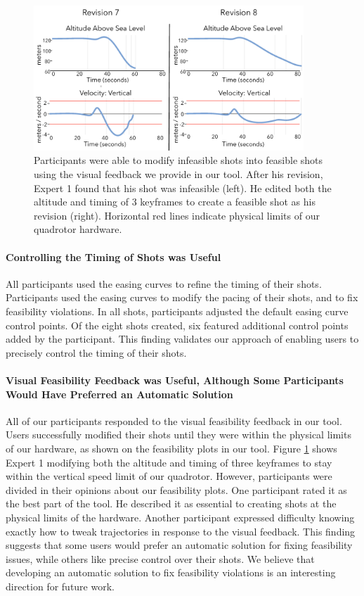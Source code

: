 \begin{figure}[t]
\centering
\includegraphics[width=4.0in]{images/2015_siggraph_asia/edit-infeasible.pdf}
\caption{
Participants were able to modify infeasible shots into feasible shots using the visual feedback we provide in our tool.
After his  revision, Expert 1 found that his shot was infeasible (left).
He edited both the altitude and timing of 3 keyframes to create a feasible shot as his  revision (right).
Horizontal red lines indicate physical limits of our quadrotor hardware.
}
\label{fig:ch2:feasibility_fix}
\end{figure}

\paragraph{Controlling the Timing of Shots was Useful}
All participants used the easing curves to refine the timing of their shots.
Participants used the easing curves to modify the pacing of their shots, and to fix feasibility violations.
In all shots, participants adjusted the default easing curve control points.
Of the eight shots created, six featured additional control points added by the participant.
This finding validates our approach of enabling users to precisely control the timing of their shots.

\paragraph{Visual Feasibility Feedback was Useful, Although Some Participants Would Have Preferred an Automatic Solution}
All of our participants responded to the visual feasibility feedback in our tool.
Users successfully modified their shots until they were within the physical limits of our hardware, as shown on the feasibility plots in our tool.
Figure \ref{fig:ch2:feasibility_fix} shows Expert 1 modifying both the altitude and timing of three keyframes to stay within the vertical speed limit of our quadrotor.
However, participants were divided in their opinions about our feasibility plots.
One participant rated it as the best part of the tool.
He described it as essential to creating shots at the physical limits of the hardware.
Another participant expressed difficulty knowing exactly how to tweak trajectories in response to the visual feedback.
This finding suggests that some users would prefer an automatic solution for fixing feasibility issues, while others like precise control over their shots.
We believe that developing an automatic solution to fix feasibility violations is an interesting direction for future work.

